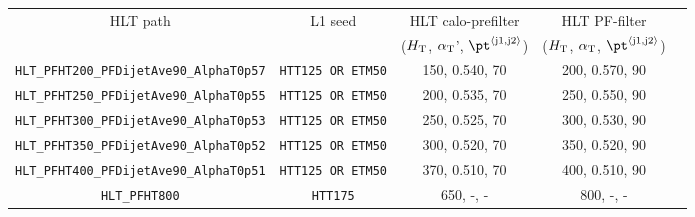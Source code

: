 \begin{table}[h!]
\footnotesize
\centering
\begin{tabular}{c|cccc} 
\hline
\hline
HLT path     & L1 seed & HLT calo-prefilter & HLT PF-filter                                                \\
    &        & ($\mbox{$H_\text{T}$}$, $\alpha_{\text{T}}$', $\pt^{\rm \left<j1,j2\right>}$) & ($\mbox{$H_\text{T}$}$, $\alpha_{\text{T}}$, $\pt^{\rm \left<j1,j2\right>}$) \\ %
\hline
 \verb!HLT_PFHT200_PFDijetAve90_AlphaT0p57! & \verb!HTT125 OR ETM50! & 150, 0.540, 70 & 200, 0.570, 90 \\ %
 \verb!HLT_PFHT250_PFDijetAve90_AlphaT0p55! & \verb!HTT125 OR ETM50! & 200, 0.535, 70 & 250, 0.550, 90 \\ %
 \verb!HLT_PFHT300_PFDijetAve90_AlphaT0p53! & \verb!HTT125 OR ETM50! & 250, 0.525, 70 & 300, 0.530, 90 \\ %
 \verb!HLT_PFHT350_PFDijetAve90_AlphaT0p52! & \verb!HTT125 OR ETM50! & 300, 0.520, 70 & 350, 0.520, 90 \\ %
 \verb!HLT_PFHT400_PFDijetAve90_AlphaT0p51! & \verb!HTT125 OR ETM50! & 370, 0.510, 70 & 400, 0.510, 90 \\ %
 \verb!HLT_PFHT800!                         & \verb!HTT175!          & 650, -, -      & 800, -, -      \\ %
\hline
\hline
\end{tabular}
\label{tab:2015_Hadronic_Signal_Triggers}
\end{table}

